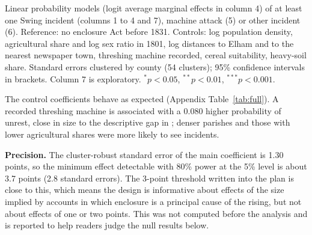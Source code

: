 \documentclass[11pt,a4paper]{article}
\begin{document}
\begin{table}[tbp]\centering\footnotesize\caption{Enclosure by Act and Swing unrest: main estimates (percentage points).}\label{tab:main}\par\vspace{4pt}\parbox{\textwidth}{\footnotesize Linear probability models (logit average marginal effects in column 4) of at least one Swing incident (columns 1 to 4 and 7), machine attack (5) or other incident (6). Reference: no enclosure Act before 1831. Controls: log population density, agricultural share and log sex ratio in 1801, log distances to Elham and to the nearest newspaper town, threshing machine recorded, cereal suitability, heavy-soil share. Standard errors clustered by county (54 clusters); 95\% confidence intervals in brackets. Column 7 is exploratory. $^{*}p<0.05$, $^{**}p<0.01$, $^{***}p<0.001$.}\end{table}

The control coefficients behave as expected (Appendix Table~\ref{tab:full}). A recorded threshing machine is associated with a 0.080 higher probability of unrest, close in size to the descriptive gap in \citet{caprettinivoth2020}; denser parishes and those with lower agricultural shares were more likely to see incidents.

\textbf{Precision.} The cluster-robust standard error of the main coefficient is 1.30 points, so the minimum effect detectable with 80\% power at the 5\% level is about 3.7 points (2.8 standard errors). The 3-point threshold written into the plan is close to this, which means the design is informative about effects of the size implied by accounts in which enclosure is a principal cause of the rising, but not about effects of one or two points. This was not computed before the analysis and is reported to help readers judge the null results below.
\end{document}
